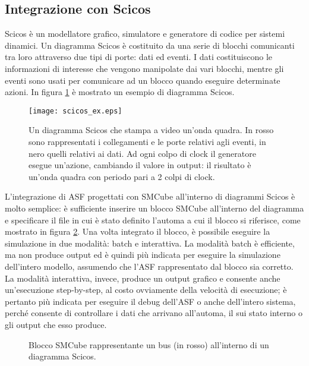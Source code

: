 \subsection{Integrazione con Scicos}
Scicos è un modellatore grafico, simulatore e generatore di codice per sistemi dinamici. Un diagramma Scicos è costituito da una serie di blocchi comunicanti tra loro attraverso due tipi di porte: dati ed eventi. I dati costituiscono le informazioni di interesse che vengono manipolate dai vari blocchi, mentre gli eventi sono usati per comunicare ad un blocco quando eseguire determinate azioni. In figura \ref{Fig:scicos_ex} è mostrato un esempio di diagramma Scicos.\\

\begin{figure}
\centering
\texttt{[image: scicos\_ex.eps]}
\caption{Un diagramma Scicos che stampa a video un'onda quadra. In rosso sono rappresentati i collegamenti e le porte relativi agli eventi, in nero quelli relativi ai dati. Ad ogni colpo di clock il generatore esegue un'azione, cambiando il valore in output: il risultato è un'onda quadra con periodo pari a 2 colpi di clock.}
\label{Fig:scicos_ex}
\end{figure}

L'integrazione di ASF progettati con SMCube all'interno di diagrammi Scicos è molto semplice: è sufficiente inserire un blocco SMCube all'interno del diagramma e specificare il file in cui è stato definito l'automa a cui il blocco si riferisce, come mostrato in figura \ref{Fig:smcube_scicos_ex}. Una volta integrato il blocco, è possibile eseguire la simulazione in due modalità: batch e interattiva. La modalità batch è efficiente, ma non produce output ed è quindi più indicata per eseguire la simulazione dell'intero modello, assumendo che l'ASF rappresentato dal blocco sia corretto. La modalità interattiva, invece, produce un output grafico e consente anche un'esecuzione step-by-step, al costo ovviamente della velocità di esecuzione; è pertanto più indicata per eseguire il debug dell'ASF o anche dell'intero sistema, perché consente di controllare i dati che arrivano all'automa, il sui stato interno o gli output che esso produce.

\begin{figure}
\centering
{}%
\caption{Blocco SMCube rappresentante un bus (in rosso) all'interno di un diagramma Scicos.}
\label{Fig:smcube_scicos_ex}
\end{figure}